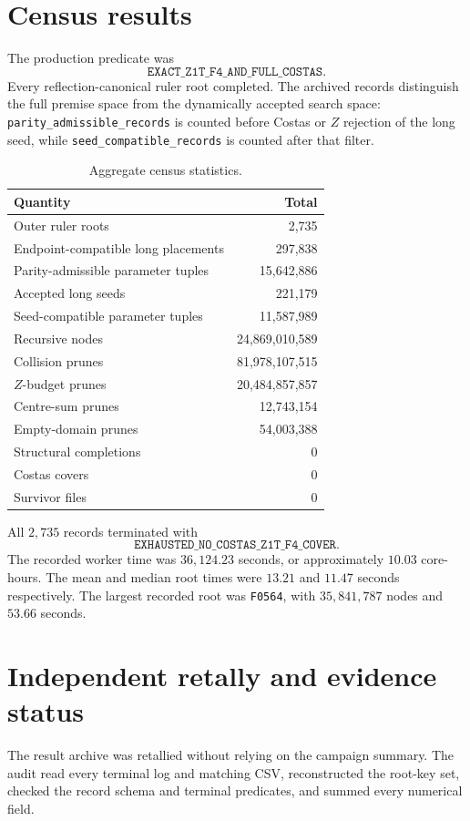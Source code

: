 \documentclass[11pt,a4paper]{article}
\theoremstyle{definition}\newtheorem{definition}[theorem]{Definition}\newtheorem{remark}[theorem]{Remark}
\newcommand{\code}[1]{\texttt{#1}}
\begin{document}
\section{Census results}
The production predicate was
\[
\code{EXACT\_Z1T\_F4\_AND\_FULL\_COSTAS}.
\]
Every reflection-canonical ruler root completed.  The archived records distinguish the full premise space from the dynamically accepted search space: \code{parity\_admissible\_records} is counted before Costas or $Z$ rejection of the long seed, while \code{seed\_compatible\_records} is counted after that filter.

\begin{table}[ht]
\centering
\caption{Aggregate census statistics.}
\label{tab:aggregate}
\begin{tabular}{lr}
\toprule
Quantity & Total\\
\midrule
Outer ruler roots & 2,735\\
Endpoint-compatible long placements & 297,838\\
Parity-admissible parameter tuples & 15,642,886\\
Accepted long seeds & 221,179\\
Seed-compatible parameter tuples & 11,587,989\\
Recursive nodes & 24,869,010,589\\
Collision prunes & 81,978,107,515\\
$Z$-budget prunes & 20,484,857,857\\
Centre-sum prunes & 12,743,154\\
Empty-domain prunes & 54,003,388\\
Structural completions & 0\\
Costas covers & 0\\
Survivor files & 0\\
\bottomrule
\end{tabular}
\end{table}

All $2{,}735$ records terminated with
\[
\code{EXHAUSTED\_NO\_COSTAS\_Z1T\_F4\_COVER}.
\]
The recorded worker time was $36{,}124.23$ seconds, or approximately $10.03$ core-hours.  The mean and median root times were $13.21$ and $11.47$ seconds respectively.  The largest recorded root was \code{F0564}, with $35{,}841{,}787$ nodes and $53.66$ seconds.

\section{Independent retally and evidence status}
The result archive was retallied without relying on the campaign summary.  The audit read every terminal log and matching CSV, reconstructed the root-key set, checked the record schema and terminal predicates, and summed every numerical field.
\end{document}
